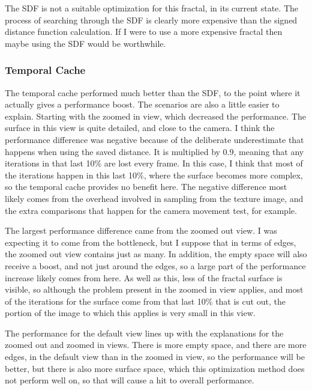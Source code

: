 The SDF is not a suitable optimization for this fractal, in its current state. The process of searching through the SDF is clearly more expensive than the signed distance function calculation. If I were to use a more expensive fractal then maybe using the SDF would be worthwhile.

\subsubsection{Temporal Cache}

The temporal cache performed much better than the SDF, to the point where it actually gives a performance boost. The scenarios are also a little easier to explain. Starting with the zoomed in view, which decreased the performance. The surface in this view is quite detailed, and close to the camera. I think the performance difference was negative because of the deliberate underestimate that happens when using the saved distance. It is multiplied by 0.9, meaning that any iterations in that last 10\% are lost every frame. In this case, I think that most of the iterations happen in this last 10\%, where the surface becomes more complex, so the temporal cache provides no benefit here. The negative difference most likely comes from the overhead involved in sampling from the texture image, and the extra comparisons that happen for the camera movement test, for example.\newline

The largest performance difference came from the zoomed out view. I was expecting it to come from the bottleneck, but I suppose that in terms of edges, the zoomed out view contains just as many. In addition, the empty space will also receive a boost, and not just around the edges, so a large part of the performance increase likely comes from here. As well as this, less of the fractal surface is visible, so although the problem present in the zoomed in view applies, and most of the iterations for the surface come from that last 10\% that is cut out, the portion of the image to which this applies is very small in this view.\newline

The performance for the default view lines up with the explanations for the zoomed out and zoomed in views. There is more empty space, and there are more edges, in the default view than in the zoomed in view, so the performance will be better, but there is also more surface space, which this optimization method does not perform well on, so that will cause a hit to overall performance.\newline

